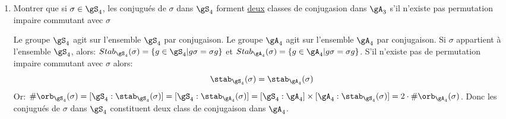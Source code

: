 \begin{exercise}
\begin{enumerate}
		\item Montrer que si $\sigma\in\gS_4$, les conjugués de $\sigma$ dans $\gS_4$ forment \underline{deux} classes de conjugasion dans $\gA_3$ s'il n'existe pas permutation impaire commutant avec $\sigma$

		\begin{remark}
			Le groupe $\gS_4$ agit sur l'ensemble $\gS_4$ par conjugaison.
			Le groupe $\gA_4$ agit sur l'ensemble $\gA_4$ par conjugaison.
			Si $\sigma$ appartient à l'ensemble $\gS_4$, alors: $Stab_{\gS_4}(\sigma)=\{g\in\gS_4 | g\sigma=\sigma g\}$ et $Stab_{\gA_4}(\sigma)=\{g\in\gA_4 | g\sigma=\sigma g\}$. S'il n'existe pas de permutation impaire commutant avec $\sigma$ alors:
			$$\stab_{\gS_4}(\sigma)=\stab_{\gA_4}(\sigma)$$
			Or: $\#\orb_{\gS_4}(\sigma)=[\gS_4: \stab_{\gS_4}(\sigma)]=[\gS_4: \stab_{\gA_4}(\sigma)]=[\gS_4:\gA_4]\times[\gA_4: \stab_{\gS_4}(\sigma)]=2\cdot \#\orb_{\gA_4}(\sigma)$. Donc les conjugués de $\sigma$ dans $\gS_4$ constituent deux class de conjugaison dans $\gA_4$.
		\end{remark}

	\end{enumerate}
\end{exercise}

